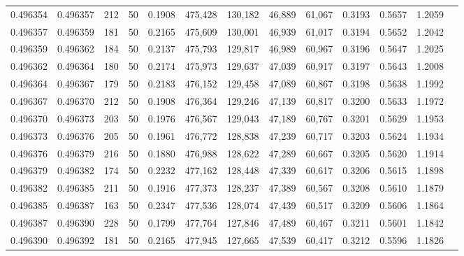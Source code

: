 \begin{tabular}{rrrrrrrrrrrrr}
0.496354 & 0.496357 &   212 &  50 &                                     0.1908 & 475,428 & 130,182 &  46,889 &  61,067 & 0.3193 & 0.5657 & 1.2059 \\
0.496357 & 0.496359 &   181 &  50 &                                     0.2165 & 475,609 & 130,001 &  46,939 &  61,017 & 0.3194 & 0.5652 & 1.2042 \\
0.496359 & 0.496362 &   184 &  50 &                                     0.2137 & 475,793 & 129,817 &  46,989 &  60,967 & 0.3196 & 0.5647 & 1.2025 \\
0.496362 & 0.496364 &   180 &  50 &                                     0.2174 & 475,973 & 129,637 &  47,039 &  60,917 & 0.3197 & 0.5643 & 1.2008 \\
0.496364 & 0.496367 &   179 &  50 &                                     0.2183 & 476,152 & 129,458 &  47,089 &  60,867 & 0.3198 & 0.5638 & 1.1992 \\
0.496367 & 0.496370 &   212 &  50 &                                     0.1908 & 476,364 & 129,246 &  47,139 &  60,817 & 0.3200 & 0.5633 & 1.1972 \\
0.496370 & 0.496373 &   203 &  50 &                                     0.1976 & 476,567 & 129,043 &  47,189 &  60,767 & 0.3201 & 0.5629 & 1.1953 \\
0.496373 & 0.496376 &   205 &  50 &                                     0.1961 & 476,772 & 128,838 &  47,239 &  60,717 & 0.3203 & 0.5624 & 1.1934 \\
0.496376 & 0.496379 &   216 &  50 &                                     0.1880 & 476,988 & 128,622 &  47,289 &  60,667 & 0.3205 & 0.5620 & 1.1914 \\
0.496379 & 0.496382 &   174 &  50 &                                     0.2232 & 477,162 & 128,448 &  47,339 &  60,617 & 0.3206 & 0.5615 & 1.1898 \\
0.496382 & 0.496385 &   211 &  50 &                                     0.1916 & 477,373 & 128,237 &  47,389 &  60,567 & 0.3208 & 0.5610 & 1.1879 \\
0.496385 & 0.496387 &   163 &  50 &                                     0.2347 & 477,536 & 128,074 &  47,439 &  60,517 & 0.3209 & 0.5606 & 1.1864 \\
0.496387 & 0.496390 &   228 &  50 &                                     0.1799 & 477,764 & 127,846 &  47,489 &  60,467 & 0.3211 & 0.5601 & 1.1842 \\
0.496390 & 0.496392 &   181 &  50 &                                     0.2165 & 477,945 & 127,665 &  47,539 &  60,417 & 0.3212 & 0.5596 & 1.1826 \\

\end{tabular}
